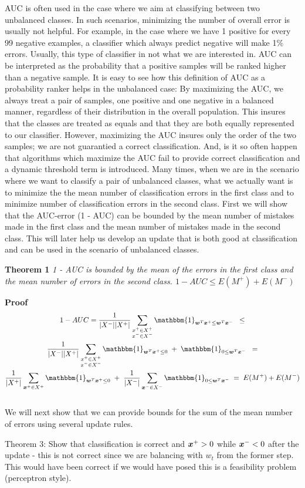 AUC is often used in the case where we aim at classifying between two unbalanced classes. In such scenarios, minimizing the number of overall error is usually not helpful. For example, in the case where we have 1 positive for every 99 negative examples, a classifier which always predict negative will make 1\% errors. Usually, this type of classifier in not what we are interested in. AUC can be interpreted as the probability that a positive samples will be ranked higher than a negative sample. It is easy to see how this definition of AUC as a probability ranker helps in the unbalanced case:   By maximizing the AUC, we always treat a pair of samples, one positive and one negative in a balanced manner, regardless of their distribution in the overall population. This insures that the classes are treated as equals and that they are both equally represented to our classifier. However, maximizing the AUC insures only the order of the two samples; we are not guarantied a correct classification. And, is it so often happen that algorithms which maximize the AUC fail to provide correct classification and a dynamic threshold term is introduced. Many times, when we are in the scenario where we want to classify a pair of unbalanced classes, what we actually want is to minimize the the mean number of classification errors in the first class and to minimize number of classification errors in the second class. First we will show that the AUC-error (1 - AUC) can be bounded by the mean number of mistakes made in the first class and the mean number of mistakes made in the second class. This will later help us develop an update that is both good at classification and can be used in the scenario of unbalanced classes.

{\bf Theorem 1} {\it 1 - AUC is bounded by the mean 
of the errors in the first class and the mean number of errors in the second
class.  $1 - AUC \leq E(M^+) + E(M^-)$ 
}

{\bf Proof} 
\begin{multline}
1 - AUC = \frac{1}{|X^-| |X^+|} \sum\limits_{ \substack{x^+ \in X^+ \\ x^- \in X^-}} {  \mathbbm{1}_{\vw^T \vx^+ \leq \vw^T \vx^-} } \;\;\leq \\
\frac{1}{|X^-| |X^+|}  \sum\limits_{ \substack{x^+ \in X^+ \\ x^- \in X^-}} {  \mathbbm{1}_{\vw^T \vxp \leq 0} \;+\; \mathbbm{1}_{0 \leq \vw^T \vxn}  }  \;\;= \\
\frac{1}{|X^+|}  \sum\limits_{\vxp \in X^+}{  \mathbbm{1}_{\vw^T \vxp \leq 0} } \;+\; \frac{1}{|X^-|}  \sum\limits_{\vxn \in X^-}{\mathbbm{1}_{0 \leq \vw^T \vxn }  }   \;= \;
E(M^+) + E(M^-)
\end{multline}
\hfill\BlackBox \\


We will next show that we can provide bounds for the sum of the mean number of errors using several update rules.


Theorem 3: Show that classification is correct and $\bm{x}^+ >0$ while $\bm{x}^- < 0$ after the update - this is not correct since we are balancing with $w_t$ from the former step.
This would have been correct if we would have posed this is a feasibility problem (perceptron style).
